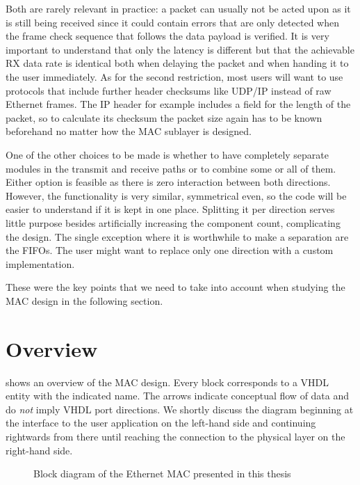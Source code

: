 \documentclass[a4paper, 11pt, oneside]{Thesis}  %
\begin{document}
Both are rarely relevant in practice: a packet can usually not be acted upon as it is still being received since it could contain errors that are only detected when the frame check sequence that follows the data payload is verified. It is very important to understand that only the latency is different but that the achievable RX data rate is identical both when delaying the packet and when handing it to the user immediately. As for the second restriction, most users will want to use protocols that include further header checksums like UDP/IP instead of raw Ethernet frames. The IP header for example includes a field for the length of the packet, so to calculate its checksum the packet size again has to be known beforehand no matter how the MAC sublayer is designed.

One of the other choices to be made is whether to have completely separate modules in the transmit and receive paths or to combine some or all of them. Either option is feasible as there is zero interaction between both directions. However, the functionality is very similar, symmetrical even, so the code will be easier to understand if it is kept in one place. Splitting it per direction serves little purpose besides artificially increasing the component count, complicating the design. The single exception where it is worthwhile to make a separation are the FIFOs. The user might want to replace only one direction with a custom implementation.

These were the key points that we need to take into account when studying the MAC design in the following section.

\section{Overview}\label{ch:overview}

 shows an overview of the MAC design. Every block corresponds to a VHDL entity with the indicated name. The arrows indicate conceptual flow of data and do \emph{not} imply VHDL port directions. We shortly discuss the diagram beginning at the interface to the user application on the left-hand side and continuing rightwards from there until reaching the connection to the physical layer on the right-hand side.

\begin{figure}
\centering

\caption{Block diagram of the Ethernet MAC presented in this thesis}
\label{fig:system}
\end{figure}
\end{document}
